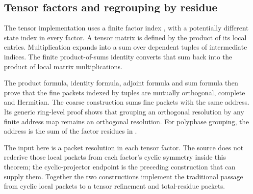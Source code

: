 \subsection{Tensor factors and regrouping by residue}
The tensor implementation uses a finite factor index , with a potentially different state index  in every factor. A tensor matrix is defined by the product of its local entries. Multiplication expands into a sum over dependent tuples of intermediate indices. The finite product-of-sums identity converts that sum back into the product of local matrix multiplications.


The product formula, identity formula, adjoint formula and sum formula then prove that the fine packets indexed by tuples are mutually orthogonal, complete and Hermitian. The coarse construction sums fine packets with the same address. Its generic ring-level proof shows that grouping an orthogonal resolution by any finite address map remains an orthogonal resolution. For polyphase grouping, the address is the sum of the factor residues in .



The input here is a packet resolution in each tensor factor. The source does not rederive those local packets from each factor's cyclic symmetry inside this theorem; the cyclic-projector endpoint is the preceding construction that can supply them. Together the two constructions implement the traditional passage from cyclic local packets to a tensor refinement and total-residue packets.

